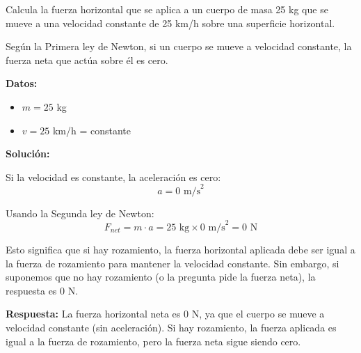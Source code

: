 \begin{exercise}
    Calcula la fuerza horizontal que se aplica a un cuerpo de masa 25 kg que se mueve a una velocidad constante de 25 km/h sobre una superficie horizontal.

    \begin{solu}
        Según la Primera ley de Newton, si un cuerpo se mueve a velocidad constante, la fuerza neta que actúa sobre él es cero.

        \textbf{Datos:}
        \begin{itemize}
            \item $m = 25$ kg
            \item $v = 25$ km/h = constante
        \end{itemize}

        \textbf{Solución:}

        Si la velocidad es constante, la aceleración es cero:
        $$a = 0\text{ m/s}^2$$

        Usando la Segunda ley de Newton:
        $$F_{net} = m \cdot a = 25\text{ kg} \times 0\text{ m/s}^2 = 0\text{ N}$$

        Esto significa que si hay rozamiento, la fuerza horizontal aplicada debe ser igual a la fuerza de rozamiento para mantener la velocidad constante. Sin embargo, si suponemos que no hay rozamiento (o la pregunta pide la fuerza neta), la respuesta es 0 N.

        \textbf{Respuesta:} La fuerza horizontal neta es 0 N, ya que el cuerpo se mueve a velocidad constante (sin aceleración). Si hay rozamiento, la fuerza aplicada es igual a la fuerza de rozamiento, pero la fuerza neta sigue siendo cero.
    \end{solu}
\end{exercise}

